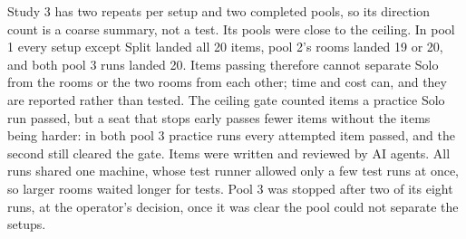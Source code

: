 Study 3 has two repeats per setup and two completed pools, so its direction count is a coarse summary, not a test. Its pools were close to the ceiling. In pool 1 every setup except Split landed all 20 items, pool 2's rooms landed 19 or 20, and both pool 3 runs landed 20. Items passing therefore cannot separate Solo from the rooms or the two rooms from each other; time and cost can, and they are reported rather than tested. The ceiling gate counted items a practice Solo run passed, but a seat that stops early passes fewer items without the items being harder: in both pool 3 practice runs every attempted item passed, and the second still cleared the gate. Items were written and reviewed by AI agents. All runs shared one machine, whose test runner allowed only a few test runs at once, so larger rooms waited longer for tests. Pool 3 was stopped after two of its eight runs, at the operator's decision, once it was clear the pool could not separate the setups.

